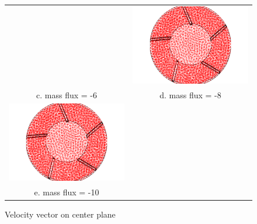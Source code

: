\documentclass[letterpaper,12pt]{article}
\begin{document}
\begin{figure}[!h!tbp]
\begin{center}
\begin{tabular}{ c c }
 & \includegraphics[scale=0.263157894737]{./Figures/Image_10.png}
 \\ c. mass flux = -6 & d. mass flux = -8 \\
\includegraphics[scale=0.263157894737]{./Figures/Image_11.png}
 &  \\ e. mass flux = -10 &  \\
\end{tabular}
\caption{\label{fig:vel}
Velocity vector on center plane}
\end{center}
\end{figure}
\vfill
\newpage
\clearpage
\end{document}

